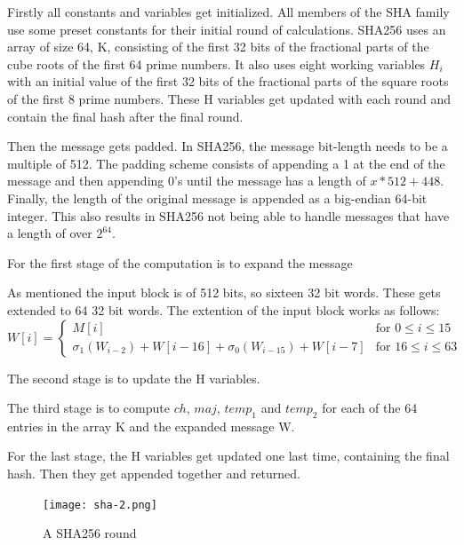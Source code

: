 \documentclass[a4paper, openany]{book}
\begin{document}
\begin{abstact}
Firstly all constants and variables get initialized. All members of the SHA family use some preset constants for their initial round of calculations.
SHA256 uses an array of size 64, K, consisting of the first 32 bits of the fractional parts of the cube roots of the first 64 prime numbers.
It also uses eight working variables \(H_i\) with an initial value of the first 32 bits of the fractional parts of the square roots of the first 8 prime numbers.
These H variables get updated with each round and contain the final hash after the final round.

Then the message gets padded. In SHA256, the message bit-length needs to be a multiple of 512.
The padding scheme consists of appending a 1 at the end of the message and then appending 0's until the message has a length of \(x*512+448\).
Finally, the length of the original message is appended as a big-endian 64-bit integer.
This also results in SHA256 not being able to handle messages that have a length of over \(2^{64}\).

For the first stage of the computation is to expand the message

As mentioned the input block is of 512 bits, so sixteen 32 bit words. These gets extended to 64 32 bit words.
The extention of the input block works as follows:
\begin{equation}
  W[i] =
  \begin{cases}
    M[i]  &\text{for } 0 \leq i \leq 15\\
    \sigma_1(W_{i-2}) + W[i-16] + \sigma_0(W_{i-15}) + W[i-7] &\text{for } 16 \leq i \leq 63
  \end{cases}
\end{equation}

The second stage is to update the H variables.

The third stage is to compute \(ch\), \(maj\), \(temp_1\) and \(temp_2\) for each of the 64 entries in the array K and the expanded message W.

For the last stage, the H variables get updated one last time, containing the final hash. Then they get appended together and returned.

\begin{figure}[H]
\centering
\texttt{[image: sha-2.png]}
\caption{A SHA256 round}
\label{fig:sha256round}
\end{figure}

\end{abstact}
\end{document}
